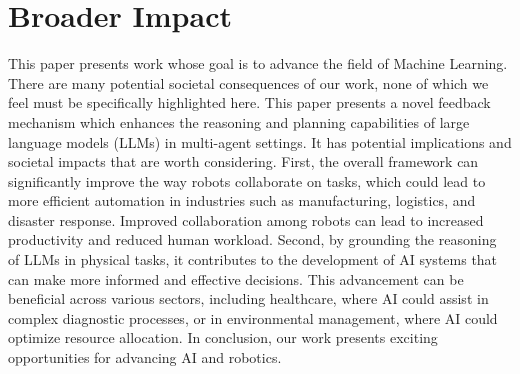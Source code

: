 \documentclass[11pt]{article}
\theoremstyle{plain}
\theoremstyle{remark}
\begin{document}
\section{Broader Impact}
This paper presents work whose goal is to advance the field of Machine Learning. There are many potential societal consequences of our work, none of which we feel must be specifically highlighted here.
This paper presents a novel feedback mechanism which enhances the reasoning and planning capabilities of large language models (LLMs) in multi-agent settings. It has potential implications and societal impacts that are worth considering. First, the overall framework can significantly improve the way robots collaborate on tasks, which could lead to more efficient automation in industries such as manufacturing, logistics, and disaster response. Improved collaboration among robots can lead to increased productivity and reduced human workload. Second, by grounding the reasoning of LLMs in physical tasks, it contributes to the development of AI systems that can make more informed and effective decisions. This advancement can be beneficial across various sectors, including healthcare, where AI could assist in complex diagnostic processes, or in environmental management, where AI could optimize resource allocation. In conclusion, our work presents exciting opportunities for advancing AI and robotics.
\end{document}
